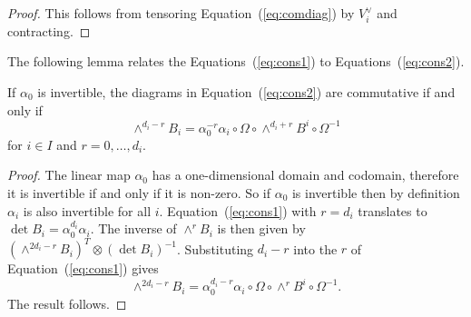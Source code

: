 \documentclass{amsart}
\theoremstyle{definition}
\begin{document}
\begin{proof}
This follows from tensoring Equation~(\ref{eq:comdiag}) by $V_i^\vee$ and contracting.
\end{proof}



The following lemma relates the Equations~(\ref{eq:cons1}) to Equations~(\ref{eq:cons2}).

\begin{lemma}
If $\alpha_0$ is invertible, the diagrams in Equation~(\ref{eq:cons2}) are commutative if and only if
$$\wedge^{d_i-r} B_i = \alpha_0^{-r} \alpha_i \circ \Omega \circ \wedge^{d_i+r} B^i \circ \Omega^{-1}$$
for $i\in I$ and $r=0,\ldots,d_i$.
\end{lemma}

\begin{proof}
The linear map $\alpha_0$ has a one-dimensional domain and codomain, therefore it is invertible if and only if it is non-zero.
So if $\alpha_0$ is invertible then by definition $\alpha_i$ is also invertible for all $i$.
Equation~(\ref{eq:cons1}) with $r=d_i$ translates to $\det B_i= \alpha_0^{d_i} \alpha_i$.
The inverse of $\wedge^r B_i$ is then given by $(\wedge^{2d_i-r}B_i)^T \otimes (\det B_i)^{-1}$.
Substituting $d_i-r$ into the $r$ of Equation~(\ref{eq:cons1}) gives $$\wedge^{2d_i-r} B_i = \alpha_0^{d_i-r} \alpha_i \circ \Omega \circ \wedge ^r B^i \circ \Omega^{-1}.$$
The result follows.
\end{proof}


\end{document}
